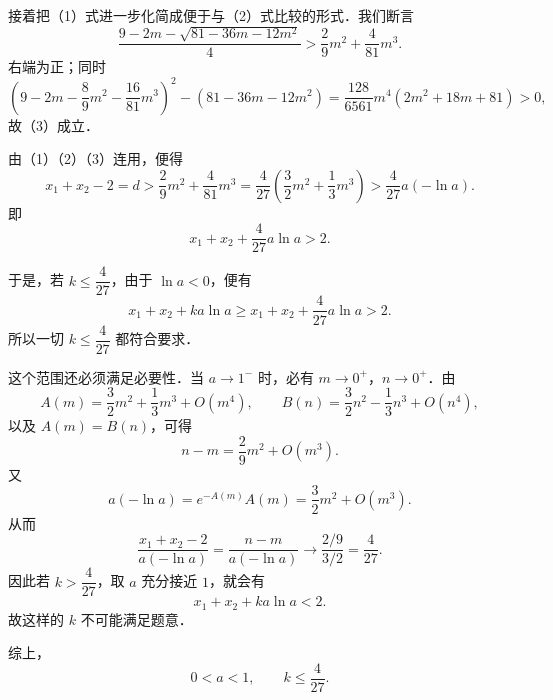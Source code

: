 \begin{solution}
接着把（1）式进一步化简成便于与（2）式比较的形式．我们断言
\[
\frac{9-2m-\sqrt{81-36m-12m^2}}4>\frac29 m^2+\frac4{81}m^3. \tag{3}
\]
右端为正；同时
\[
\left(9-2m-\frac89 m^2-\frac{16}{81}m^3\right)^2-(81-36m-12m^2)
=\frac{128}{6561}m^4(2m^2+18m+81)>0,
\]
故（3）成立．

由（1）（2）（3）连用，便得
\[
x_1+x_2-2=d>\frac29 m^2+\frac4{81}m^3
=\frac4{27}\left(\frac32 m^2+\frac13 m^3\right)
>\frac4{27}a(-\ln a).
\]
即
\[
x_1+x_2+\frac4{27}a\ln a>2. \tag{4}
\]

于是，若 $k\le \dfrac4{27}$，由于 $\ln a<0$，便有
\[
x_1+x_2+ka\ln a\ge x_1+x_2+\frac4{27}a\ln a>2.
\]
所以一切 $k\le \dfrac4{27}$ 都符合要求．

这个范围还必须满足必要性．当 $a\to1^{-}$ 时，必有 $m\to0^+$，$n\to0^+$．由
\[
A(m)=\frac32 m^2+\frac13 m^3+O(m^4),\qquad
B(n)=\frac32 n^2-\frac13 n^3+O(n^4),
\]
以及 $A(m)=B(n)$，可得
\[
n-m=\frac29 m^2+O(m^3).
\]
又
\[
a(-\ln a)=e^{-A(m)}A(m)=\frac32 m^2+O(m^3).
\]
从而
\[
\frac{x_1+x_2-2}{a(-\ln a)}
=\frac{n-m}{a(-\ln a)}
\to \frac{2/9}{3/2}=\frac4{27}.
\]
因此若 $k>\dfrac4{27}$，取 $a$ 充分接近 $1$，就会有
\[
x_1+x_2+ka\ln a<2.
\]
故这样的 $k$ 不可能满足题意．

综上，
\[
\boxed{0<a<1},\qquad \boxed{k\le \frac4{27}}.
\]
\end{solution}

